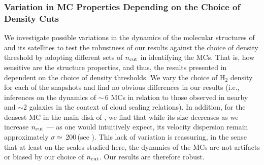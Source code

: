 \documentclass[iop]{emulateapj}
\begin{document}
\subsubsection{Variation in MC Properties Depending on the Choice of Density Cuts}	 \label{sec:ncut}
We investigate possible variations in the dynamics of the molecular structures of \flower and its satellites
to test
the robustness of our results against the choice of density threshold by adopting
different sets of $n_{\rm cut}$ in identifying the MCs.
That is, how sensitive are the structure properties, and thus, the results presented in 
dependent on the choice of density thresholds.
We vary the choice of H$_2$ density for each of the snapshots and
find no obvious differences in our results (i.e., inferences on the dynamics of \z$\sim$\,6
MCs in relation to those observed in nearby and \z$\sim$2 galaxies in the context of
cloud scaling relations).
In addition, for the densest MC in the main disk of \flower, we find that while
its size decreases as we increase $n_{\rm cut}$ --- as one would intuitively expect,
its velocity dispersion remain
approximately $\sigma\simeq$\,200\,\kms (see ).
This lack of variation is reassuring, in the sense that at least on the scales studied here,
the dynamics of the MCs are not artifacts or biased by our choice of $n_{\rm cut}$.
Our results are therefore robust.
\end{document}
